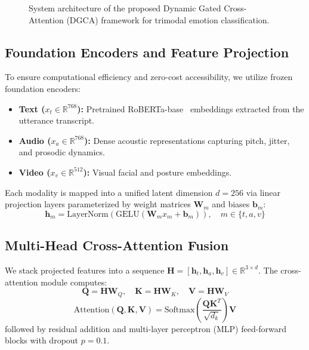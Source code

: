 \documentclass[10pt,twocolumn,letterpaper]{article}
\begin{document}
\begin{figure}[t]
\centering
\caption{System architecture of the proposed Dynamic Gated Cross-Attention (DGCA) framework for trimodal emotion classification.}
\label{fig:architecture}
\end{figure}

\subsection{Foundation Encoders and Feature Projection}
To ensure computational efficiency and zero-cost accessibility, we utilize frozen foundation encoders:
\begin{itemize}
    \item \textbf{Text ($x_t \in \mathbb{R}^{768}$):} Pretrained RoBERTa-base~\cite{liu2019roberta} embeddings extracted from the utterance transcript.
    \item \textbf{Audio ($x_a \in \mathbb{R}^{768}$):} Dense acoustic representations capturing pitch, jitter, and prosodic dynamics.
    \item \textbf{Video ($x_v \in \mathbb{R}^{512}$):} Visual facial and posture embeddings.
\end{itemize}

Each modality is mapped into a unified latent dimension $d = 256$ via linear projection layers parameterized by weight matrices $\mathbf{W}_m$ and biases $\mathbf{b}_m$:
\begin{equation}
    \mathbf{h}_m = \text{LayerNorm}(\text{GELU}(\mathbf{W}_m x_m + \mathbf{b}_m)), \quad m \in \{t, a, v\}
\end{equation}

\subsection{Multi-Head Cross-Attention Fusion}
We stack projected features into a sequence $\mathbf{H} = [\mathbf{h}_t, \mathbf{h}_a, \mathbf{h}_v] \in \mathbb{R}^{3 \times d}$. The cross-attention module computes:
\begin{equation}
    \mathbf{Q} = \mathbf{H}\mathbf{W}_Q, \quad \mathbf{K} = \mathbf{H}\mathbf{W}_K, \quad \mathbf{V} = \mathbf{H}\mathbf{W}_V
\end{equation}
\begin{equation}
    \text{Attention}(\mathbf{Q}, \mathbf{K}, \mathbf{V}) = \text{Softmax}\left(\frac{\mathbf{Q}\mathbf{K}^T}{\sqrt{d_k}}\right)\mathbf{V}
\end{equation}
followed by residual addition and multi-layer perceptron (MLP) feed-forward blocks with dropout $p = 0.1$.
\end{document}
